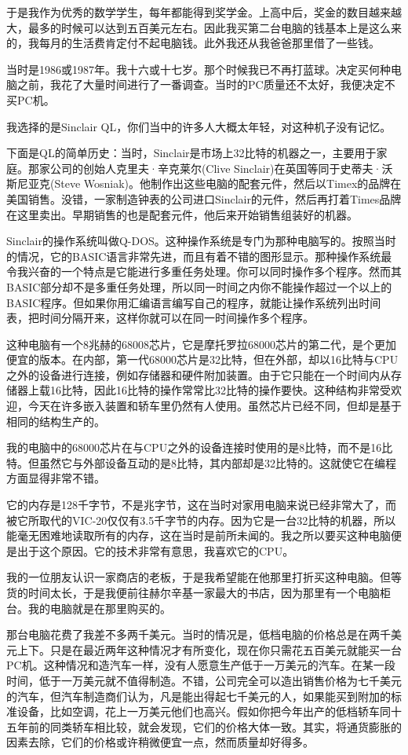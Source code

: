 于是我作为优秀的数学学生，每年都能得到奖学金。上高中后，奖金的数目越来越大，最多的时候可以达到五百美元左右。因此我买第二台电脑的钱基本上是这么来的，我每月的生活费肯定付不起电脑钱。此外我还从我爸爸那里借了一些钱。

当时是1986或1987年。我十六或十七岁。那个时候我已不再打蓝球。决定买何种电脑之前，我花了大量时间进行了一番调查。当时的PC质量还不太好，我便决定不买PC机。

我选择的是Sinclair QL，你们当中的许多人大概太年轻，对这种机子没有记忆。

下面是QL的简单历史：当时，Sinclair是市场上32比特的机器之一，主要用于家庭。那家公司的创始人克里夫·辛克莱尔(Clive Sinclair)在英国等同于史蒂夫·沃斯尼亚克(Steve Wosniak)。他制作出这些电脑的配套元件，然后以Timex的品牌在美国销售。没错，一家制造钟表的公司进口Sinclair的元件，然后再打着Times品牌在这里卖出。早期销售的也是配套元件，他后来开始销售组装好的机器。

Sinclair的操作系统叫做Q-DOS。这种操作系统是专门为那种电脑写的。按照当时的情况，它的BASIC语言非常先进，而且有着不错的图形显示。那种操作系统最令我兴奋的一个特点是它能进行多重任务处理。你可以同时操作多个程序。然而其BASIC部分却不是多重任务处理，所以同一时间之内你不能操作超过一个以上的BASIC程序。但如果你用汇编语言编写自己的程序，就能让操作系统列出时间表，把时间分隔开来，这样你就可以在同一时间操作多个程序。

这种电脑有一个8兆赫的68008芯片，它是摩托罗拉68000芯片的第二代，是个更加便宜的版本。在内部，第一代68000芯片是32比特，但在外部，却以16比特与CPU之外的设备进行连接，例如存储器和硬件附加装置。由于它只能在一个时间内从存储器上载16比特，因此16比特的操作常常比32比特的操作要快。这种结构非常受欢迎，今天在许多嵌入装置和轿车里仍然有人使用。虽然芯片已经不同，但却是基于相同的结构生产的。

我的电脑中的68000芯片在与CPU之外的设备连接时使用的是8比特，而不是16比特。但虽然它与外部设备互动的是8比特，其内部却是32比特的。这就使它在编程方面显得非常不错。

它的内存是128千字节，不是兆字节，这在当时对家用电脑来说已经非常大了，而被它所取代的VIC-20仅仅有3.5千字节的内存。因为它是一台32比特的机器，所以能毫无困难地读取所有的内存，这在当时是前所未闻的。我之所以要买这种电脑便是出于这个原因。它的技术非常有意思，我喜欢它的CPU。

我的一位朋友认识一家商店的老板，于是我希望能在他那里打折买这种电脑。但等货的时间太长，于是我便前往赫尔辛基一家最大的书店，因为那里有一个电脑柜台。我的电脑就是在那里购买的。

那台电脑花费了我差不多两千美元。当时的情况是，低档电脑的价格总是在两千美元上下。只是在最近两年这种情况才有所变化，现在你只需花五百美元就能买一台PC机。这种情况和造汽车一样，没有人愿意生产低于一万美元的汽车。在某一段时间，低于一万美元就不值得制造。不错，公司完全可以造出销售价格为七千美元的汽车，但汽车制造商们认为，凡是能出得起七千美元的人，如果能买到附加的标准设备，比如空调，花上一万美元他们也高兴。假如你把今年出产的低档轿车同十五年前的同类轿车相比较，就会发现，它们的价格大体一致。其实，将通货膨胀的因素去除，它们的价格或许稍微便宜一点，然而质量却好得多。

